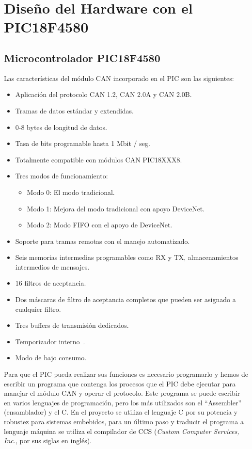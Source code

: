 \section{Diseño del Hardware con el PIC18F4580}
\subsection{Microcontrolador PIC18F4580}

Las características del módulo CAN incorporado en el PIC son las siguientes:
\begin{itemize}
	\item Aplicación del protocolo CAN 1.2,
	CAN 2.0A y CAN 2.0B.
	\item Tramas de datos estándar y extendidas.
	\item 0-8 bytes de longitud de datos.
	\item Tasa de bits programable hasta 1 Mbit / seg.
	\item Totalmente compatible con módulos CAN PIC18XXX8.
	\item Tres modos de funcionamiento:
	\begin{itemize}
		\item Modo 0: El modo tradicional.
		\item Modo 1: Mejora del modo tradicional con
		apoyo DeviceNet.
		\item Modo 2: Modo FIFO con el apoyo de DeviceNet.
		\end {itemize}
		\item Soporte para tramas remotas con el manejo automatizado.
		\item  Seis memorias intermedias programables como RX y TX, 
		almacenamientos intermedios de mensajes.
		\item 16 filtros de aceptancia.
		\item Dos máscaras de filtro de aceptancia completos que pueden ser asignado a cualquier filtro.
		\item Tres buffers de transmisión dedicados.
		\item Temporizador interno~\cite{DaP}.
		\item Modo de bajo consumo.
	\end{itemize}

Para que el PIC pueda realizar sus funciones es necesario programarlo y hemos de escribir un programa que contenga los procesos que el PIC debe ejecutar para manejar el módulo CAN y operar el protocolo. 
Este programa se puede escribir en varios lenguajes de programación, pero los  más utilizados son el ``Assembler'' (ensamblador) y el C. 
En el proyecto se utiliza el lenguaje C por su potencia y robustez para sistemas embebidos, para un último paso y traducir el programa a lenguaje máquina se utiliza el compilador  de CCS (\textit{Custom Computer Services, Inc.}, por sus siglas en inglés).

